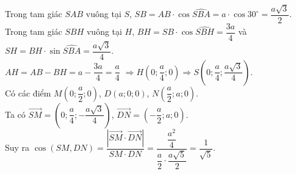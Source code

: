 \begin{ex}
{		Trong tam giác $SAB$ vuông tại $S$, $SB=AB\cdot\cos \widehat{SBA}=a\cdot\cos30^\circ =\dfrac{a\sqrt{3}}{2}$.\\
		Trong tam giác $SBH$ vuông tại $H$, $BH=SB\cdot\cos\widehat{SBH}=\dfrac{3a}{4}$ và $SH=BH\cdot\sin\widehat{SBA}=\dfrac{a\sqrt{3}}{4}$.\\
		$AH=AB-BH=a-\dfrac{3a}{4}=\dfrac{a}{4}$ $\Rightarrow H\left(0;\dfrac{a}{4};0\right) \Rightarrow S\left(0;\dfrac{a}{4};\dfrac{a\sqrt{3}}{4}\right)$.\\
		Có các điểm $M\left(0;\dfrac{a}{2};0\right)$, $D\left(a;0;0\right)$, $N\left(\dfrac{a}{2};a;0\right)$.\\
		Ta có $\overrightarrow{SM}=\left(0;\dfrac{a}{4};-\dfrac{a\sqrt{3}}{4}\right)$, $\overrightarrow{DN}=\left(-\dfrac{a}{2};a;0\right)$.\\
		Suy ra $\cos\left(SM,DN\right) =\dfrac{\left|\overrightarrow{SM}\cdot\overrightarrow{DN}\right|}{SM\cdot DN} =\dfrac{\dfrac{a^2}{4}}{\dfrac{a}{2}\cdot\dfrac{a\sqrt{5}}{2}}=\dfrac{1}{\sqrt{5}}$.
	}
\end{ex}

